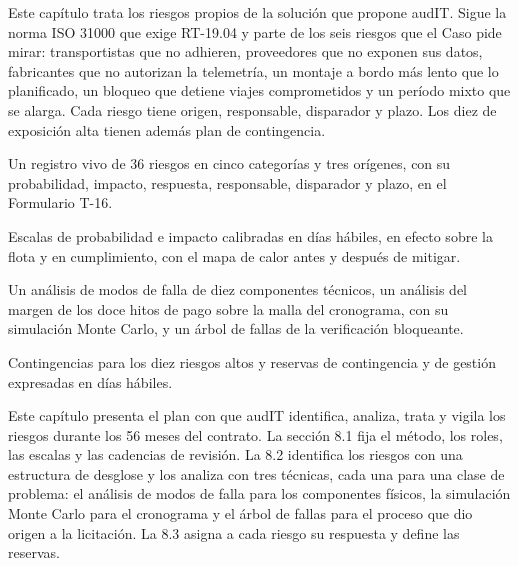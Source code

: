 %

\begin{resumenApertura}
Este capítulo trata los riesgos propios de la solución que propone audIT. Sigue la norma ISO 31000 que exige RT-19.04 y parte de los seis riesgos que el Caso pide mirar:
transportistas que no adhieren, proveedores que no exponen sus datos, fabricantes que no autorizan la
telemetría, un montaje a bordo más lento que lo planificado, un bloqueo que detiene viajes comprometidos
y un período mixto que se alarga. Cada riesgo tiene origen, responsable, disparador y plazo. Los diez de
exposición alta tienen además plan de contingencia.
\begin{recibe}
  \item Un registro vivo de 36 riesgos en cinco categorías y tres orígenes, con su probabilidad, impacto, respuesta, responsable, disparador y plazo, en el Formulario T-16.
  \item Escalas de probabilidad e impacto calibradas en días hábiles, en efecto sobre la flota y en cumplimiento, con el mapa de calor antes y después de mitigar.
  \item Un análisis de modos de falla de diez componentes técnicos, un análisis del margen de los doce hitos de pago sobre la malla del cronograma, con su simulación Monte Carlo, y un árbol de fallas de la verificación bloqueante.
  \item Contingencias para los diez riesgos altos y reservas de contingencia y de gestión expresadas en días hábiles.
\end{recibe}
\end{resumenApertura}

Este capítulo presenta el plan con que audIT identifica, analiza, trata y vigila los riesgos durante los
56 meses del contrato. La sección 8.1 fija el método, los roles, las escalas y las cadencias de revisión.
La 8.2 identifica los riesgos con una estructura de desglose y los analiza con tres técnicas, cada una
para una clase de problema: el análisis de modos de falla para los componentes físicos, la simulación
Monte Carlo para el cronograma y el árbol de fallas para el proceso que dio origen a la licitación. La
8.3 asigna a cada riesgo su respuesta y define las reservas.


